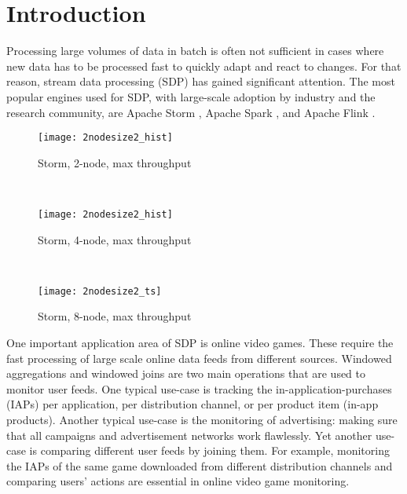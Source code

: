 \section{Introduction}
Processing large volumes of data in batch is often not sufficient in cases where new data has to be processed fast to quickly adapt and react to changes. For that reason, stream data processing (SDP) has gained significant attention. The most popular engines used for SDP, with large-scale adoption by industry and the research community, are Apache Storm \cite{toshniwal2014storm}, Apache Spark  \cite{zaharia2012discretized}, and Apache Flink \cite{carbone2015apache}. 

\begin{figure*}
    \centering
    \begin{subfigure}[b]{0.3\textwidth}
        \texttt{[image: 2nodesize2\_hist]}

        \caption{Storm, 2-node, max  throughput }
    \end{subfigure}
    ~ 
    \begin{subfigure}[b]{0.3\textwidth}
        \texttt{[image: 2nodesize2\_hist]}

        \caption{Storm, 4-node, max   throughput }
    \end{subfigure}
    ~ 
    \begin{subfigure}[b]{0.3\textwidth}
        \texttt{[image: 2nodesize2\_ts]}

        \caption{Storm, 8-node, max  throughput }
        
    \end{subfigure}
\end{figure*}

One  important application area of SDP is  online video games. These require the fast processing  of large scale online data feeds  from different sources. Windowed aggregations and windowed joins are two main operations that are used to monitor user feeds. One typical use-case is tracking the in-application-purchases (IAPs) per application, per distribution channel, or per product item (in-app products). Another typical use-case is the monitoring of advertising:  making sure that all campaigns and advertisement networks work flawlessly. Yet another use-case is comparing different user feeds by  joining them. For example, monitoring the IAPs of the same game downloaded from different distribution channels and comparing users'  actions  are essential in  online video game monitoring.


